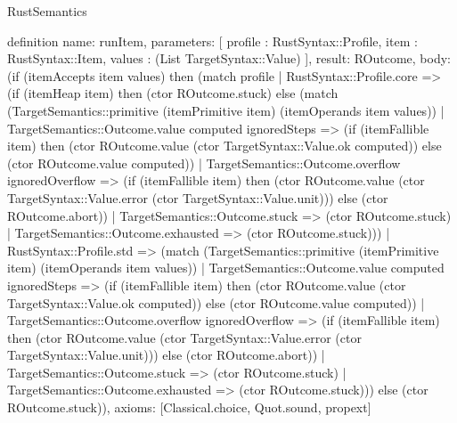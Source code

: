 \begin{lexlean}{RustSemantics}
\begin{semanticmodule}
definition{
  name: runItem,
  parameters: [
    profile : RustSyntax::Profile,
    item : RustSyntax::Item,
    values : (List TargetSyntax::Value)
  ],
  result: ROutcome,
  body: (if (itemAccepts item values) then (match profile
    | RustSyntax::Profile.core => (if (itemHeap item) then (ctor ROutcome.stuck) else (match (TargetSemantics::primitive (itemPrimitive item) (itemOperands item values))
      | TargetSemantics::Outcome.value computed ignoredSteps => (if (itemFallible item) then (ctor ROutcome.value (ctor TargetSyntax::Value.ok computed)) else (ctor ROutcome.value computed))
      | TargetSemantics::Outcome.overflow ignoredOverflow => (if (itemFallible item) then (ctor ROutcome.value (ctor TargetSyntax::Value.error (ctor TargetSyntax::Value.unit))) else (ctor ROutcome.abort))
      | TargetSemantics::Outcome.stuck => (ctor ROutcome.stuck)
      | TargetSemantics::Outcome.exhausted => (ctor ROutcome.stuck)))
    | RustSyntax::Profile.std => (match (TargetSemantics::primitive (itemPrimitive item) (itemOperands item values))
      | TargetSemantics::Outcome.value computed ignoredSteps => (if (itemFallible item) then (ctor ROutcome.value (ctor TargetSyntax::Value.ok computed)) else (ctor ROutcome.value computed))
      | TargetSemantics::Outcome.overflow ignoredOverflow => (if (itemFallible item) then (ctor ROutcome.value (ctor TargetSyntax::Value.error (ctor TargetSyntax::Value.unit))) else (ctor ROutcome.abort))
      | TargetSemantics::Outcome.stuck => (ctor ROutcome.stuck)
      | TargetSemantics::Outcome.exhausted => (ctor ROutcome.stuck))) else (ctor ROutcome.stuck)),
  axioms: [Classical.choice, Quot.sound, propext]
}


\end{semanticmodule}
\end{lexlean}
